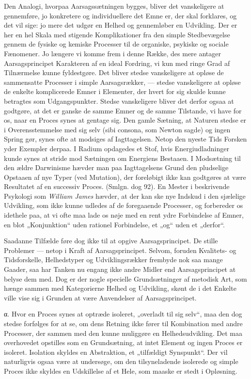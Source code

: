 \documentclass[12pt,a4paper]{book}
\newcommand{\opage}[1]{\marginnote{\footnotesize\textit{[#1]}}}
\newcommand{\apage}[1]{\marginnote{\footnotesize\textit{[#1]}}}
\begin{document}
Den Analogi, hvorpaa Aarsagssætningen bygges, bliver det vanskeligere at gennemføre,
jo konkretere og individuellere det Emne er, der skal forklares, og det vil sige: jo
mere det udgør en Helhed og gennemløber en \opage{288} Udvikling. Der er her en hel Skala med
stigende Komplikationer fra den simple Stedbevægelse gennem de fysiske og kemiske
Processer til de organiske, psykiske og sociale Fænomener. Jo længere vi komme frem
i denne Række, des mere antager Aarsagsprincipet Karakteren af en ideal Fordring, vi
kun med ringe Grad af Tilnærmelse kunne fyldestgøre. Det bliver stedse vanskeligere
at opløse de sammensatte Processer i simple Aarsagsrækker, --- stedse vanskeligere at
opløse de enkelte komplicerede Emner i Elementer, der hvert for sig skulde kunne
betragtes som Udgangspunkter. Stedse vanskeligere bliver det derfor ogsaa at
godtgøre, at det er ganske de samme Emner og de samme Tilstande, vi have for os, naar
en Proces synes at gentage sig. Den gamle Sætning, at Naturen stedse er i
Overensstemmelse med sig selv (sibi consona, som Newton sagde) og ingen Spring gør,
synes ofte at modsiges af Iagttagelsen. Netop den nyeste Tids Forsken yder Exempler
derpaa. I Radium opdagedes et Stof, hvis Energiudladninger kunde synes at stride mod
Sætningen om Energiens Bestaaen. I Modsætning til den ældre Darwinisme hævder man
paa Iagttagelsens Grund den pludselige Opstaaen af nye Typer (ved Mutation), der
foreløbigt ikke kan godtgøres at være Resultatet af en successiv Proces. (Smlgn. dog
92). En Mester i beskrivende Psykologi som \emph{William James} hævder, at der kan
ske nye Indskud i den sjælelige Udvikling, som ikke kunne udledes af de foregaaende
Processer, og forbereder os idethele paa, at vi ofte maa lade os nøje med en rent
ydre Forbindelse af Emner, en blot „Konjunktion“ uden rationel Forbindelse, et „og“
uden et „derfor“.

Saadanne Tilfælde føre dog ikke til at opgive Aarsagsprincipet. De stille Problemer
--- netop i Kraft af Aarsagsprincipet. Selvom, foruden Kvalitets- og Tidsforskelle,
Helhedstyper og Udviklingsrækker frembyde nok saa mange Gaader, saa har Tanken nu
engang ikke andre Midler end Aarsagsprincipet at belyse dem med. Dog er der nogle
specielle Grundsætninger af metodisk Art, som hænge sammen med Kategorierne Helhed
og Udvikling, skønt de i det \apage{289} Enkelte ville vise sig i Grunden at være Anvendelser af
Aarsagsprincipet.

α. Hvor en Proces synes at optræde isoleret, „overladt til sig selv“, maa den dog
stedse forfølges for at se, om dens Retning ikke fører til Kombination med andre
Processer, der sammen med den kunne muliggøre en Helhedsudvikling. Det maa
overhovedet opstilles som en Grundsætning, at intet Element og ingen Proces er
isoleret. Isolation skyldes en Abstraktion, et „tilfældigt Synspunkt“. Der vil
naturligvis ogsaa være at undersøge, om den tilsyneladende isolerede og simple
Proces ikke skyldes en Udskillelse af et Hele, som maaske er stedt i Opløsning.
\end{document}
